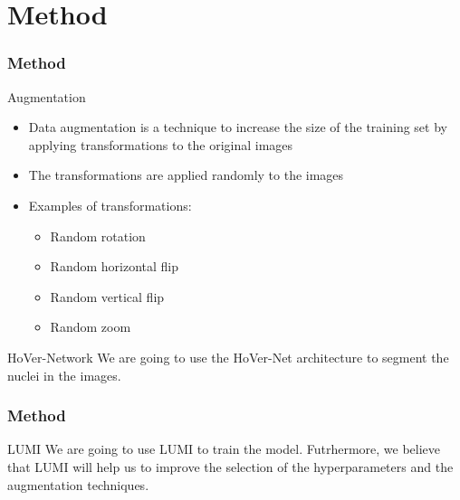 \documentclass[../main.tex]{subfiles}
\begin{document}
\section{Method}
\begin{frame}[t]
    \frametitle{Method}

    \begin{block}{Augmentation}
        \begin{itemize}
            \item Data augmentation is a technique to increase the size of 
            the training set by applying transformations to the original images
            \item The transformations are applied randomly to the images
            \item Examples of transformations:
            \begin{itemize}
                \item Random rotation
                \item Random horizontal flip
                \item Random vertical flip
                \item Random zoom
            \end{itemize}
        \end{itemize}
    \end{block}

    \begin{block}{HoVer-Network}
    We are going to use the HoVer-Net architecture to segment the nuclei in the images.
    \end{block}
\end{frame}

\begin{frame}[t]
    \frametitle{Method}
    \begin{block}{LUMI}
        We are going to use LUMI to train the model. 
        Futrhermore, we believe that LUMI will help us 
        to improve the selection of the hyperparameters and 
        the augmentation techniques.
    \end{block}
    

\end{frame}
\end{document}
